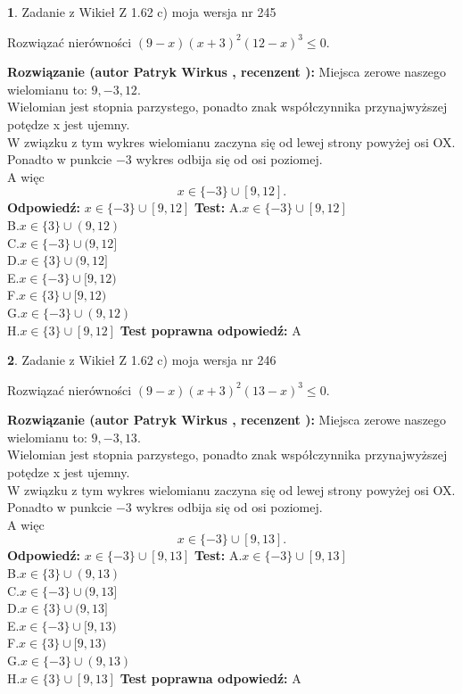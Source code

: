 \documentclass[12pt, a4paper]{article}
\theoremstyle{definition} %
\newtheorem{zad}{}
\newcommand{\zadStart}[1]{\begin{zad}#1\newline}
\newcommand{\zadStop}{\end{zad}}
\newcommand{\rozwStart}[2]{\noindent \textbf{Rozwiązanie (autor #1 , recenzent #2): }\newline}
\newcommand{\rozwStop}{\newline}
\newcommand{\odpStart}{\noindent \textbf{Odpowiedź:}\newline}
\newcommand{\odpStop}{\newline}
\newcommand{\testStart}{\noindent \textbf{Test:}\newline}
\newcommand{\testStop}{\newline}
\newcommand{\kluczStart}{\noindent \textbf{Test poprawna odpowiedź:}\newline}
\newcommand{\kluczStop}{\newline}
\begin{document}
\zadStart{Zadanie z Wikieł Z 1.62 c) moja wersja nr 245}

Rozwiązać nierówności $(9-x)(x+3)^{2}(12-x)^{3}\le0$.
\zadStop
\rozwStart{Patryk Wirkus}{}
Miejsca zerowe naszego wielomianu to: $9, -3, 12$.\\
Wielomian jest stopnia parzystego, ponadto znak współczynnika przy\linebreak najwyższej potędze x jest ujemny.\\ W związku z tym wykres wielomianu zaczyna się od lewej strony powyżej osi OX.\\
Ponadto w punkcie $-3$ wykres odbija się od osi poziomej.\\
A więc $$x \in \{-3\} \cup [9,12].$$
\rozwStop
\odpStart
$x \in \{-3\} \cup [9,12]$
\odpStop
\testStart
A.$x \in \{-3\} \cup [9,12]$\\
B.$x \in \{3\} \cup (9,12)$\\
C.$x \in \{-3\} \cup (9,12]$\\
D.$x \in \{3\} \cup (9,12]$\\
E.$x \in \{-3\} \cup [9,12)$\\
F.$x \in \{3\} \cup [9,12)$\\
G.$x \in \{-3\} \cup (9,12)$\\
H.$x \in \{3\} \cup [9,12]$
\testStop
\kluczStart
A
\kluczStop



\zadStart{Zadanie z Wikieł Z 1.62 c) moja wersja nr 246}

Rozwiązać nierówności $(9-x)(x+3)^{2}(13-x)^{3}\le0$.
\zadStop
\rozwStart{Patryk Wirkus}{}
Miejsca zerowe naszego wielomianu to: $9, -3, 13$.\\
Wielomian jest stopnia parzystego, ponadto znak współczynnika przy\linebreak najwyższej potędze x jest ujemny.\\ W związku z tym wykres wielomianu zaczyna się od lewej strony powyżej osi OX.\\
Ponadto w punkcie $-3$ wykres odbija się od osi poziomej.\\
A więc $$x \in \{-3\} \cup [9,13].$$
\rozwStop
\odpStart
$x \in \{-3\} \cup [9,13]$
\odpStop
\testStart
A.$x \in \{-3\} \cup [9,13]$\\
B.$x \in \{3\} \cup (9,13)$\\
C.$x \in \{-3\} \cup (9,13]$\\
D.$x \in \{3\} \cup (9,13]$\\
E.$x \in \{-3\} \cup [9,13)$\\
F.$x \in \{3\} \cup [9,13)$\\
G.$x \in \{-3\} \cup (9,13)$\\
H.$x \in \{3\} \cup [9,13]$
\testStop
\kluczStart
A
\kluczStop
\end{document}
